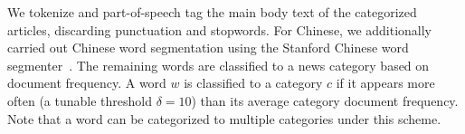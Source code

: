 \begin{CJK}{UTF8}{gbsn}


We tokenize and part-of-speech tag the main body text of the
categorized articles, discarding punctuation and stopwords.  For
Chinese, we additionally carried out Chinese word segmentation using
the Stanford Chinese word segmenter~\cite{Chang2008}. The remaining
words are classified to a news category based on document frequency. A
word $w$ is classified to a category $c$ if it appears  more often 
(a tunable threshold $\delta=10$) than its average category document
frequency.  Note that a word can be categorized to multiple categories
under this scheme.








\end{CJK}

